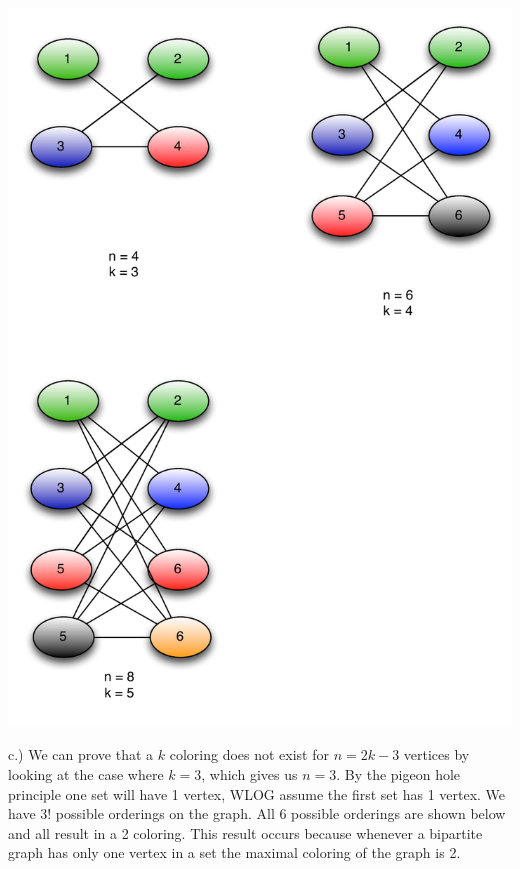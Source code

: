 \documentclass[11pt]{amsart}
\begin{document}
\begin{enumerate}
{\includegraphics[scale=.5]{colorings2}


c.) We can prove that a $k $ coloring does not exist for $n=2k-3$ vertices by looking at the case where $k = 3$, which gives us $n = 3$.  By the pigeon hole principle one set will have 1 vertex, WLOG assume the first set has 1 vertex.  We have $3!$ possible orderings on the graph.  All 6 possible orderings are shown below and all result in a 2 coloring.  This result occurs because whenever a bipartite graph has only one vertex in a set the maximal coloring of the graph is 2.

}
\end{enumerate}
\end{document}
